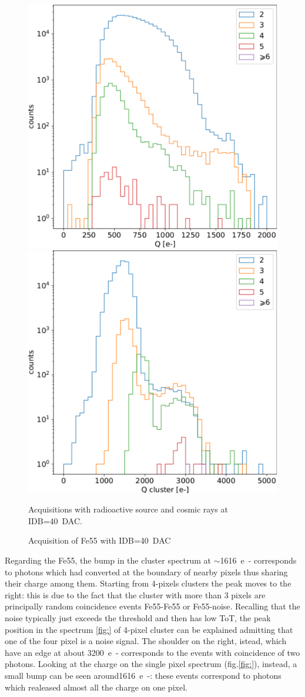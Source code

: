         \begin{figure}[h!]
            \centering
            \includegraphics[width=.49\linewidth]{figures/charaterization/Fe55_spectrum_per_pixel.pdf}
            \includegraphics[width=.49\linewidth]{figures/charaterization/Fe55_spectrum_cluster.pdf}
            \caption{Acquisitions with radioactive source and cosmic rays at IDB=\SI{40}{DAC}. }
            \caption{Acquisition of Fe55 with IDB=\SI{40}{DAC}}
            \label{fig:spectrum_Fe55}
        \end{figure}   
        Regarding the Fe55, the bump in the cluster spectrum at $\sim$\SI{1616}{e-} corresponds to photons which had converted at the boundary of nearby pixels thus sharing their charge among them. Starting from 4-pixels clusters the peak moves to the right: this is due to the fact that the cluster with more than 3 pixels are principally random coincidence events Fe55-Fe55 or Fe55-noise. Recalling that the noise typically just exceeds the threshold and then has low ToT, the peak position in the spectrum \ref{fig:} of 4-pixel cluster can be explained admitting that one of the four pixel is a noise signal. 
        The shoulder on the right, istead, which have an edge at about \SI{3200}{e-} corresponds to the events with coincidence of two photons.
        Looking at the charge on the single pixel spectrum (fig.\ref{fig:}), instead, a small bump can be seen around\SI{1616}{e-}: these events correspond to photons which realeased almost all the charge on one pixel. 

